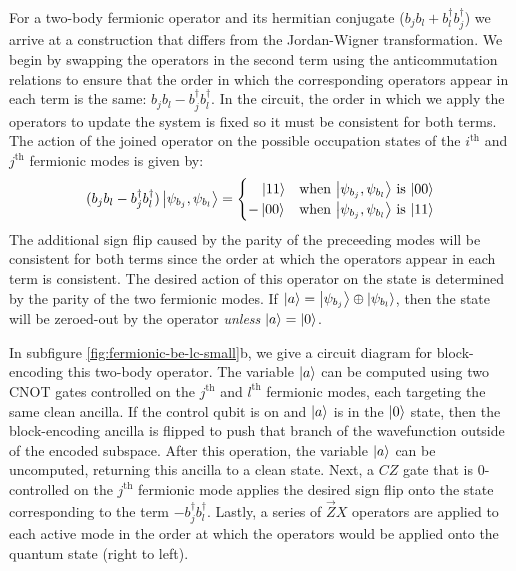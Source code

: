 For a two-body fermionic operator and its hermitian conjugate ($b_j b_l + b_l^\dagger b_j^\dagger$) we arrive at a construction that differs from the Jordan-Wigner transformation.
We begin by swapping the operators in the second term using the anticommutation relations to ensure that the order in which the corresponding operators appear in each term is the same: $b_j b_l - b_j^\dagger b_l^\dagger$.
In the circuit, the order in which we apply the operators to update the system is fixed so it must be consistent for both terms.
The action of the joined operator on the possible occupation states of the $i^\text{th}$ and $j^\text{th}$ fermionic modes is given by:
\begin{equation}
    \begin{split}
        (b_j b_l - b_j^\dagger b_l^\dagger) \ket{\psi_{b_j}, \psi_{b_l}} = \begin{cases} 
            \hspace{1em}\ket{11} & \text{when $\ket{\psi_{b_j}, \psi_{b_l}}$ is $\ket{00}$} \\
            -\ket{00} & \text{when $\ket{\psi_{b_j}, \psi_{b_l}}$ is $\ket{11}$} \\
                                        \end{cases}
    \end{split}
\end{equation}
The additional sign flip caused by the parity of the preceeding modes will be consistent for both terms since the order at which the operators appear in each term is consistent.
The desired action of this operator on the state is determined by the parity of the two fermionic modes.
If $\ket{a} = \ket{\psi_{b_j}} \oplus \ket{\psi_{b_l}}$, then the state will be zeroed-out by the operator \textit{unless} $\ket{a} = \ket{0}$.

In subfigure \ref{fig:fermionic-be-lc-small}b, we give a circuit diagram for block-encoding this two-body operator.
The variable $\ket{a}$ can be computed using two CNOT gates controlled on the $j^\text{th}$ and $l^\text{th}$ fermionic modes, each targeting the same clean ancilla.
If the control qubit is on and $\ket{a}$ is in the $\ket{0}$ state, then the block-encoding ancilla is flipped to push that branch of the wavefunction outside of the encoded subspace.
After this operation, the variable $\ket{a}$ can be uncomputed, returning this ancilla to a clean state.
Next, a $CZ$ gate that is $0$-controlled on the $j^\text{th}$ fermionic mode applies the desired sign flip onto the state corresponding to the term $- b_j^\dagger b_l^\dagger$.
Lastly, a series of $\vec{Z}X$ operators are applied to each active mode in the order at which the operators would be applied onto the quantum state (right to left).

